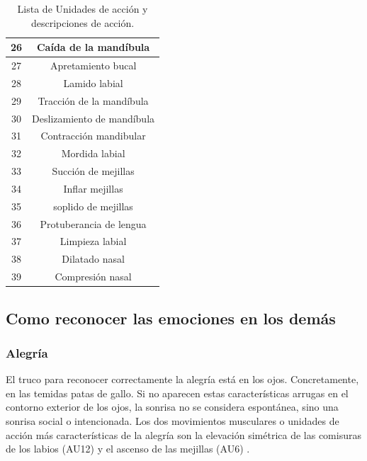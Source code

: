 \begin{table}[H]
\begin{tabular}{|c|c|}
26            & Caída de la mandíbula               \\ \hline
27            & Apretamiento bucal                  \\ \hline
28            & Lamido labial                       \\ \hline
29            & Tracción de la mandíbula            \\ \hline
30            & Deslizamiento de mandíbula          \\ \hline
31            & Contracción mandibular              \\ \hline
32            & Mordida labial                      \\ \hline
33            & Succión de mejillas                 \\ \hline
34            & Inflar mejillas                     \\ \hline
35            & soplido de mejillas                 \\ \hline
36            & Protuberancia de lengua             \\ \hline
37            & Limpieza labial                     \\ \hline
38            & Dilatado nasal                      \\ \hline
39            & Compresión nasal                    \\ \hline
\end{tabular}
\caption{Lista de Unidades de acción y descripciones de acción.}
    \label{cuadro:AU}
\end{table}

\subsection*{Como reconocer las emociones en los demás}

\subsubsection*{Alegría}
El truco para reconocer correctamente la alegría está en los ojos. Concretamente, en las temidas patas de gallo. Si no aparecen estas características arrugas en el contorno exterior de los ojos, la sonrisa no se considera espontánea, sino una sonrisa social o intencionada. Los dos movimientos musculares o unidades de acción más características de la alegría son la elevación simétrica de las comisuras de los labios (AU12) y el ascenso de las mejillas (AU6) \cite{ReconocerLasEmociones}.

